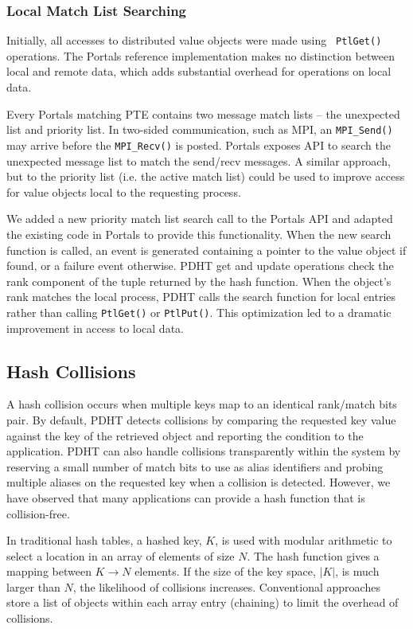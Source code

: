 \subsubsection{Local Match List Searching}

Initially, all accesses to distributed value objects were made using {\tt
  PtlGet()} operations. The Portals reference implementation makes no
distinction between local and remote data, which adds substantial overhead for
operations on local data.  

Every Portals matching PTE contains two message match lists -- the unexpected
list and priority list. In two-sided communication, such as MPI, an 
{\tt MPI\_Send()} may arrive before the {\tt MPI\_Recv()} is posted. Portals
exposes API to search the unexpected message list to match the send/recv 
messages. A similar approach, but to the priority list (i.e. the active match
list) could be used to improve access for value objects local to the requesting
process.

We added a new priority match list search call to the Portals API and adapted
the existing code in Portals to provide this functionality. When the new search
function is called, an event is generated containing a pointer to the value
object if found, or a failure event otherwise. PDHT get and update operations
check the rank component of the tuple returned by the hash function. When the
object's rank matches the local process, PDHT calls the search function for
local entries rather than calling {\tt PtlGet()} or {\tt PtlPut()}. This
optimization led to a dramatic improvement in access to local data.

\subsection{Hash Collisions} 

A hash collision occurs when multiple keys map to an identical rank/match bits
pair. By default, PDHT detects collisions by comparing the requested key value
against the key of the retrieved object and reporting the condition to the
application. PDHT can also handle collisions transparently within the system by reserving
a small number of match bits to use as alias identifiers and probing multiple
aliases on the requested key when a collision is detected. However, we have
observed that many applications can provide a hash function that is
collision-free.

In traditional hash tables, a hashed key, $K$, is used with modular arithmetic
to select a location in an array of elements of size $N$. The hash function
gives a mapping between $K \rightarrow N$ elements.  If the size of the key
space, $|K|$, is much larger than $N$, the likelihood of collisions increases.
Conventional approaches store a list of objects within each array entry
(chaining) to limit the overhead of collisions.

